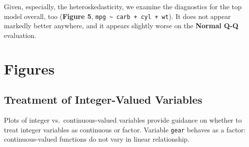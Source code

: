 \documentclass[]{article}
\begin{document}
Given, especially, the heteroskedasticity, we examine the diagnostics
for the top model overall, too (\textbf{Figure 5},
\texttt{mpg\ \textasciitilde{}\ carb\ +\ cyl\ +\ wt}). It does not
appear markedly better anywhere, and it appears slightly worse on the
\textbf{Normal Q-Q} evaluation.

\section{Figures}\label{figures}

\subsection{Treatment of Integer-Valued
Variables}\label{treatment-of-integer-valued-variables}

Plots of integer vs.~continuous-valued variables provide guidance on
whether to treat integer variables as continuous or factor. Variable
\texttt{gear} behaves as a factor: continuous-valued functions do not
vary in linear relationship.
\end{document}
